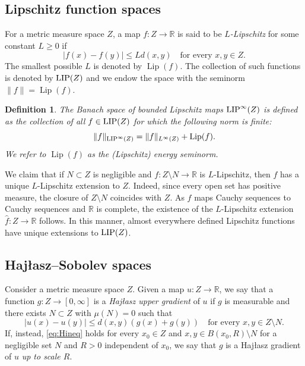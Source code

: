 \documentclass[reqno]{amsart}
\newcommand{\LIP}{{\rm LIP}}
\numberwithin{equation}{section}
\newtheorem{definition}[theorem]{Definition}
\theoremstyle{remark}
\DeclareMathOperator{\lip}{Lip}
\def\r{\right}
\def\lf{\left}
\begin{document}
\subsection{Lipschitz function spaces}
 For a metric measure space $Z$, a map $f\colon Z\to \mathbb R$ is said to be \emph{$L$-Lipschitz} for some constant $L\geq 0$ if \begin{equation}\label{eq:Lips_cond.}
|f(x)-f(y)| \leq Ld(x,y) \quad\text{for every $x,y\in Z$.}
\end{equation}
The smallest possible $L$ is denoted by $\lip(f)$. The collection of such functions is denoted by $\LIP( Z)$ and we endow the space with the seminorm $\|f\|=\lip (f)$.


\begin{definition}\label{def:lip}
The Banach space of bounded Lipschitz maps $\LIP^{\infty}(Z)$ is defined as the collection of all $f \in \LIP( Z )$ for which the following norm is finite:
$$\|f\|_{\LIP^{\infty}(Z)}= \|f\|_{L^{\infty}(Z)}+\lip(f).$$  
We refer to $\lip(f)$ as the (Lipschitz) energy seminorm.
\end{definition}

We claim that if $N \subset Z$ is negligible and $f \colon Z \setminus N \rightarrow \mathbb{R}$ is $L$-Lipschitz, then $f$ has a unique $L$-Lipschitz extension to $Z$. Indeed, since every open set has positive measure, the closure of $Z \setminus N$ coincides with $Z$. As $f$ maps Cauchy sequences to Cauchy sequences and $\mathbb{R}$ is complete, the existence of the $L$-Lipschitz extension $\widehat{f} \colon Z \rightarrow \mathbb{R}$ follows. In this manner, almost everywhere defined Lipschitz functions have unique extensions to $\LIP( Z)$.



\subsection[Hajlasz--Sobolev spaces]{Haj\l{}asz--Sobolev spaces}
Consider a metric measure space $Z$. Given a map $u \colon Z \rightarrow \mathbb{R}$, we say that a function $g \colon Z \rightarrow \left[0, \infty\right]$ is a \emph{Haj\l{}asz upper gradient} of $u$ if $g$ is measurable and there exists $N \subset Z$ with $\mu( N ) = 0$ such that
\begin{equation}\label{eq:Hineq}
    |u(x)-u(y)|
    \leq d(x,y)\lf(g(x)+g(y)\r) \quad \text{for every $x,y \in Z \setminus N$}.
\end{equation}
If, instead, \eqref{eq:Hineq} holds for every $x_0 \in Z$ and $x, y \in B( x_0, R ) \setminus N$ for a negligible set $N$ and $R > 0$ independent of $x_0$, we say that $g$ is a Haj\l{}asz gradient of $u$ \emph{up to scale $R$}.
\end{document}

